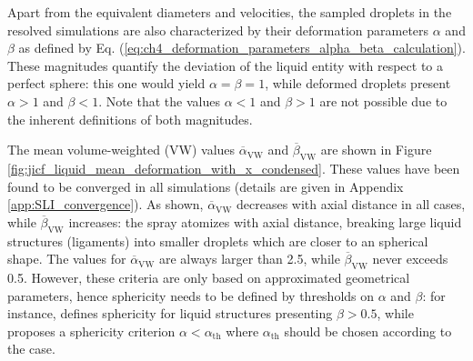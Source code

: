 Apart from the equivalent diameters and velocities, the sampled droplets in the resolved simulations are also characterized by their deformation parameters $\alpha$ and $\beta$ as defined by Eq. (\ref{eq:ch4_deformation_parameters_alpha_beta_calculation}). These magnitudes quantify the deviation of the liquid entity with respect to a perfect sphere: this one would yield $\alpha = \beta = 1$, while deformed droplets present $\alpha > 1$ and $\beta < 1$. Note that the values $\alpha < 1$ and $\beta > 1$ are not possible due to the inherent definitions of both magnitudes.


The mean volume-weighted (VW) values $\overline{\alpha}_\mathrm{VW}$ and $\overline{\beta}_\mathrm{VW}$
are shown in Figure \ref{fig:jicf_liquid_mean_deformation_with_x_condensed}. These values have been found to be converged in all simulations (details are given in Appendix \ref{app:SLI_convergence}). As shown, $\overline{\alpha}_\mathrm{VW}$ decreases with axial distance in all cases, while $\overline{\beta}_\mathrm{VW}$ increases: the spray atomizes with axial distance, breaking large liquid structures (ligaments) into smaller droplets which are closer to an spherical shape. The values for $\overline{\alpha}_\mathrm{VW}$ are always larger than 2.5, while $\overline{\beta}_\mathrm{VW}$ never exceeds 0.5. However, these criteria are only based on approximated geometrical parameters, hence sphericity needs to be defined by thresholds on $\alpha$ and $\beta$: for instance,  defines sphericity for liquid structures presenting $\beta > 0.5$, while  proposes a sphericity criterion $\alpha < \alpha_\mathrm{th}$ where $\alpha_\mathrm{th}$ should be chosen according to the case. 

